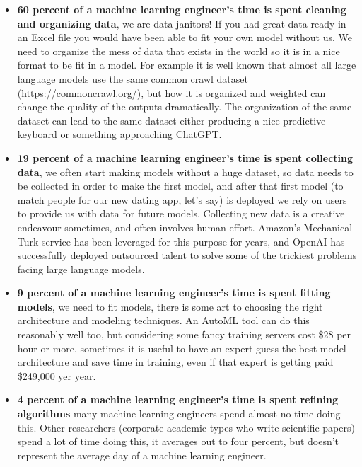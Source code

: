 \begin{itemize}
    \item \textbf{60 percent of a machine learning engineer's time is spent cleaning and organizing data}, we are data janitors! If you had great data ready in an Excel file you would have been able to fit your own model without us. We need to organize the mess of data that exists in the world so it is in a nice format to be fit in a model. For example it is well known that almost all large language models use the same common crawl dataset (\url{https://commoncrawl.org/}), but how it is organized and weighted can change the quality of the outputs dramatically. The organization of the same dataset can lead to the same dataset either producing a nice predictive keyboard or something approaching ChatGPT.  
    \item \textbf{19 percent of a machine learning engineer's time is spent collecting data}, we often start making models without a huge dataset, so data needs to be collected in order to make the first model, and after that first model (to match people for our new dating app, let's say) is deployed we rely on users to provide us with data for future models. Collecting new data is a creative endeavour sometimes, and often involves human effort. Amazon's Mechanical Turk service has been leveraged for this purpose for years, and OpenAI has successfully deployed outsourced talent to solve some of the trickiest problems facing large language models.
    \item \textbf{9 percent of a machine learning engineer's time is spent fitting models}, we need to fit models, there is some art to choosing the right architecture and modeling techniques. An AutoML tool can do this reasonably well too, but considering some fancy training servers cost \$28 per hour or more, sometimes it is useful to have an expert guess the best model architecture and save time in training, even if that expert is getting paid \$249,000 yer year.
    \item \textbf{4 percent of a machine learning engineer's time is spent refining algorithms} many machine learning engineers spend almost no time doing this. Other researchers (corporate-academic types who write scientific papers) spend a lot of time doing this, it averages out to four percent, but doesn't represent the average day of a machine learning engineer.
\end{itemize}

